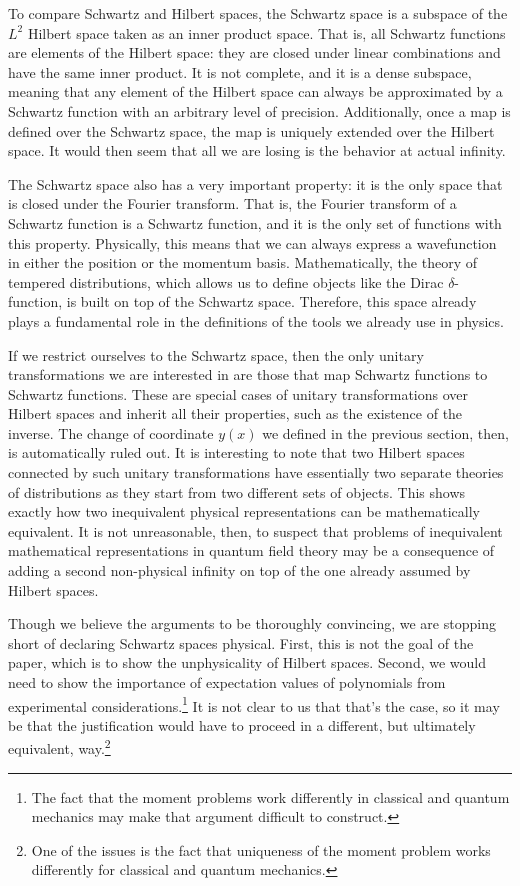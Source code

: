 \documentclass[10pt,twocolumn, nofootinbib]{revtex4-2}
\begin{document}
To compare Schwartz and Hilbert spaces, the Schwartz space is a subspace of the $L^2$ Hilbert space taken as an inner product space. That is, all Schwartz functions are elements of the Hilbert space: they are closed under linear combinations and have the same inner product. It is not complete, and it is a dense subspace, meaning that any element of the Hilbert space can always be approximated by a Schwartz function with an arbitrary level of precision. Additionally, once a map is defined over the Schwartz space, the map is uniquely extended over the Hilbert space. It would then seem that all we are losing is the behavior at actual infinity.

The Schwartz space also has a very important property: it is the only space that is closed under the Fourier transform. That is, the Fourier transform of a Schwartz function is a Schwartz function, and it is the only set of functions with this property. Physically, this means that we can always express a wavefunction in either the position or the momentum basis. Mathematically, the theory of tempered distributions, which allows us to define objects like the Dirac $\delta$-function, is built on top of the Schwartz space. Therefore, this space already plays a fundamental role in the definitions of the tools we already use in physics.

If we restrict ourselves to the Schwartz space, then the only unitary transformations we are interested in are those that map Schwartz functions to Schwartz functions. These are special cases of unitary transformations over Hilbert spaces and inherit all their properties, such as the existence of the inverse. The change of coordinate $y(x)$ we defined in the previous section, then, is automatically ruled out. It is interesting to note that two Hilbert spaces connected by such unitary transformations have essentially two separate theories of distributions as they start from two different sets of objects. This shows exactly how two inequivalent physical representations can be mathematically equivalent. It is not unreasonable, then, to suspect that problems of inequivalent mathematical representations in quantum field theory may be a consequence of adding a second non-physical infinity on top of the one already assumed by Hilbert spaces. %

Though we believe the arguments to be thoroughly convincing, we are stopping short of declaring Schwartz spaces physical. First, this is not the goal of the paper, which is to show the unphysicality of Hilbert spaces. Second, we would need to show the importance of expectation values of polynomials from experimental considerations.\footnote{The fact that the moment problems work differently in classical and quantum mechanics may make that argument difficult to construct.} It is not clear to us that that's the case, so it may be that the justification would have to proceed in a different, but ultimately equivalent, way.\footnote{One of the issues is the fact that uniqueness of the moment problem works differently for classical and quantum mechanics.}
\end{document}
